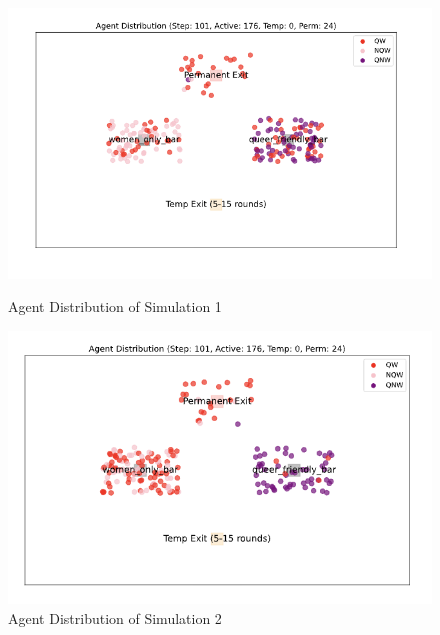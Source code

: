 \documentclass{article}
\begin{document}
\begin{figure}[H]
\centering
\begin{minipage}{0.48\textwidth}
  \centering
  \includegraphics[width=\linewidth]{figures/0.5 bar.png}
  \caption{Agent Distribution of Simulation 1}
\end{minipage}
\hfill
\begin{minipage}{0.48\textwidth}
  \centering
  \includegraphics[width=\linewidth]{figures/0.5 bar 2.png}
  \caption{Agent Distribution of Simulation 2}
\end{minipage}
\end{figure}
\end{document}
